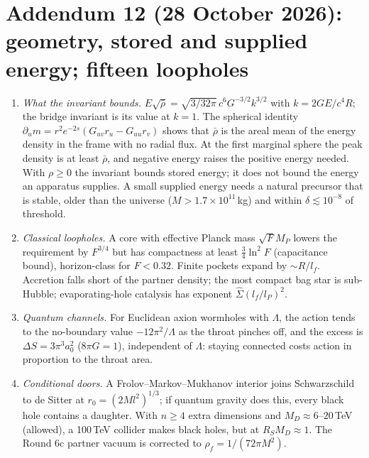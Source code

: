 \documentclass[11pt,a4paper]{article}
\theoremstyle{remark}\newtheorem{remark}[theorem]{Remark}
\begin{document}
\section*{Addendum 12 (28 October 2026): geometry, stored and supplied energy; fifteen loopholes}
\begin{enumerate}
\item \emph{What the invariant bounds.} $E\sqrt{\bar\rho}=\sqrt{3/32\pi}\,c^6G^{-3/2}k^{3/2}$ with $k=2GE/c^4R$; the bridge invariant is its value at
$k=1$. The spherical identity $\partial_um=r^2e^{-2s}(G_{uv}r_u-G_{uu}r_v)$ shows that $\bar\rho$ is the areal mean of the energy density in the frame
with no radial flux. At the first marginal sphere the peak density is at least $\bar\rho$, and negative energy raises the positive energy needed. With
$\rho\ge0$ the invariant bounds stored energy; it does not bound the energy an apparatus supplies. A small supplied energy needs a natural precursor
that is stable, older than the universe ($M>1.7\times10^{11}$\,kg) and within $\delta\lesssim10^{-8}$ of threshold.
\item \emph{Classical loopholes.} A core with effective Planck mass $\sqrt F M_P$ lowers the requirement by $F^{3/4}$ but has compactness at least
$\tfrac34\ln^2F$ (capacitance bound), horizon-class for $F<0.32$. Finite pockets expand by $\sim R/l_f$. Accretion falls short of the partner density;
the most compact bag star is sub-Hubble; evaporating-hole catalysis has exponent $\hat\Sigma(l_f/l_P)^2$.
\item \emph{Quantum channels.} For Euclidean axion wormholes with $\Lambda$, the action tends to the no-boundary value $-12\pi^2/\Lambda$ as the throat
pinches off, and the excess is $\Delta S=3\pi^3a_0^2$ ($8\pi G=1$), independent of $\Lambda$: staying connected costs action in proportion to the throat
area.
\item \emph{Conditional doors.} A Frolov--Markov--Mukhanov interior joins Schwarzschild to de Sitter at $r_0=(2Ml^2)^{1/3}$; if quantum gravity does this,
every black hole contains a daughter. With $n\ge4$ extra dimensions and $M_D\approx6$--$20$\,TeV (allowed), a 100\,TeV collider makes black holes, but at
$R_SM_D\approx1$. The Round 6c partner vacuum is corrected to $\rho_f=1/(72\pi M^2)$.
\end{enumerate}
\end{document}
